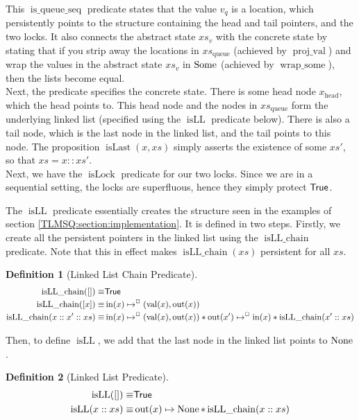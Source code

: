 \documentclass[a4paper, 10pt]{report}
\theoremstyle{definition}
\newtheorem{definition}{Definition}[section]
\newcommand{\isLock}{\operatorname{isLock}}
\newcommand{\isqueueseq}{\operatorname{is\_queue\_seq}}
\newcommand{\vq}{v_q}
\newcommand{\xsc}{xs}
\newcommand{\xsqueue}{xs_{\mathrm{queue}}}
\newcommand{\isLLchain}{\operatorname{isLL\_chain}}
\newcommand{\isLL}{\operatorname{isLL}}
\newcommand{\projval}{\operatorname{proj\_val}}
\newcommand{\wrapsome}{\operatorname{wrap\_some}}
\newcommand{\isLast}{\operatorname{isLast}}
\newcommand{\nIn}[1]{\operatorname{in}(#1)}
\newcommand{\nVal}[1]{\operatorname{val}(#1)}
\newcommand{\nOut}[1]{\operatorname{out}(#1)}
\newcommand{\node}{x}
\newcommand{\nodeN}[1]{\node_{\mathrm{#1}}}
\newcommand{\nodehead}{\nodeN{head}}
\newcommand{\absvalueList}{xs_v}
\newcommand{\isNode}[1]{\nIn{#1} \mapsto^{\persistently} (\nVal{#1}, \nOut{#1})}
\begin{document}
This $\isqueueseq$ predicate states that the value $\vq$ is a location, which persistently points to the structure containing the head and tail pointers, and the two locks. It also connects the abstract state $\absvalueList$ with the concrete state by stating that if you strip away the locations in $\xsqueue$ (achieved by $\projval$) and wrap the values in the abstract state $\absvalueList$ in $\operatorname{Some}$ (achieved by $\wrapsome$), then the lists become equal.\\
Next, the predicate specifies the concrete state. There is some head node $\nodehead$, which the head points to. This head node and the nodes in $\xsqueue$ form the underlying linked list (specified using the $\isLL$ predicate below). There is also a tail node, which is the last node in the linked list, and the tail points to this node. The proposition $\isLast(\node, \xsc)$ simply asserts the existence of some $\xsc'$, so that $\xsc = \node :: \xsc'$.\\
Next, we have the $\isLock$ predicate for our two locks. Since we are in a sequential setting, the locks are superfluous, hence they simply protect $\textsf{True}$.

The $\isLL$ predicate essentially creates the structure seen in the examples of section \ref{TLMSQ:section:implementation}. It is defined in two steps. Firstly, we create all the persistent pointers in the linked list using the $\isLLchain$ predicate. Note that this in effect makes $\isLLchain(\xsc)$ persistent for all $\xsc$.
\begin{definition}[Linked List Chain Predicate]
  \begin{align*}
    \isLLchain([]) \equiv& \TRUE\\
    \isLLchain([\node]) \equiv& \isNode{\node}\\
    \isLLchain(\node :: \node' :: \xsc) \equiv& \isNode{\node} \star \nOut{\node'} \mapsto^{\persistently} \nIn{\node} \star \isLLchain(\node' :: \xsc)
  \end{align*}
\end{definition}

Then, to define $\isLL$, we add that the last node in the linked list points to $\operatorname{None}$.
\begin{definition}[Linked List Predicate]
  \begin{align*}
    \isLL([]) \equiv& \TRUE\\
    \isLL(\node :: \xsc) \equiv& \nOut{\node} \mapsto \None \star \isLLchain(\node :: \xsc)
  \end{align*}
\end{definition}
\end{document}
